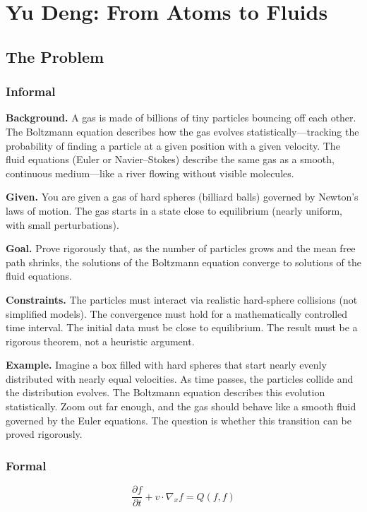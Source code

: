 \let\LocalMacro\relax

\chapter{Yu Deng: From Atoms to Fluids}

\section{The Problem}

\subsection{Informal}

\textbf{Background.} A gas is made of billions of tiny particles bouncing off each other. The Boltzmann equation describes how the gas evolves statistically---tracking the probability of finding a particle at a given position with a given velocity. The fluid equations (Euler or Navier--Stokes) describe the same gas as a smooth, continuous medium---like a river flowing without visible molecules.

\textbf{Given.} You are given a gas of hard spheres (billiard balls) governed by Newton's laws of motion. The gas starts in a state close to equilibrium (nearly uniform, with small perturbations).

\textbf{Goal.} Prove rigorously that, as the number of particles grows and the mean free path shrinks, the solutions of the Boltzmann equation converge to solutions of the fluid equations.

\textbf{Constraints.} The particles must interact via realistic hard-sphere collisions (not simplified models). The convergence must hold for a mathematically controlled time interval. The initial data must be close to equilibrium. The result must be a rigorous theorem, not a heuristic argument.

\textbf{Example.} Imagine a box filled with hard spheres that start nearly evenly distributed with nearly equal velocities. As time passes, the particles collide and the distribution evolves. The Boltzmann equation describes this evolution statistically. Zoom out far enough, and the gas should behave like a smooth fluid governed by the Euler equations. The question is whether this transition can be proved rigorously.

\subsection{Formal}
\begin{equation}
\frac{\partial f}{\partial t} + v \cdot \nabla_x f = Q(f, f)
\end{equation}

